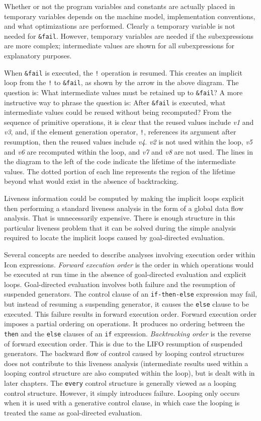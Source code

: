 Whether or not the program variables and constants are actually placed
in temporary variables depends on the machine model, implementation
conventions, and what optimizations are performed. Clearly a temporary
variable is not needed for \texttt{\&fail}. However, temporary variables are
needed if the subexpressions are more complex; intermediate values are
shown for all subexpressions for explanatory purposes.

When \texttt{\&fail} is executed, the \texttt{!} operation is
resumed. This creates an implicit loop from the \texttt{!} to
\texttt{\&fail}, as shown by the arrow in the above diagram. The
question is: What intermediate values must be retained up to
\texttt{\&fail}? A more instructive way to phrase the question is:
After \texttt{\&fail} is executed, what intermediate values could be
reused without being recomputed? From the sequence of primitive
operations, it is clear that the reused values include \textit{v1} and
\textit{v3}, and, if the element generation operator, \texttt{!},
references its argument after resumption, then the reused values
include \textit{v4}.\textit{ v2} is not used within the loop,
\textit{v5} and \textit{v6} are recomputed within the loop, and
\textit{v7} and \textit{v8} are not used. The lines in the diagram to
the left of the code indicate the lifetime of the intermediate
values. The dotted portion of each line represents the region of the
lifetime beyond what would exist in the absence of backtracking.

Liveness information could be computed by making the implicit loops
explicit then performing a standard liveness analysis in the form of a
global data flow analysis. That is unnecessarily expensive. There is
enough structure in this particular liveness problem that it can be
solved during the simple analysis required to locate the implicit
loops caused by goal-directed evaluation.

Several concepts are needed to describe analyses involving execution
order within Icon expressions. \textit{Forward execution order} is the
order in which operations would be executed at run time in the absence
of goal-directed evaluation and explicit loops. Goal-directed
evaluation involves both failure and the resumption of suspended
generators. The control clause of an \texttt{if-then-else} expression may fail,
but instead of resuming a suspending generator, it causes the \texttt{else}
clause to be executed. This failure results in forward execution
order. Forward execution order imposes a partial ordering on
operations. It produces no ordering between the \texttt{then} and the \texttt{else}
clauses of an \texttt{if} expression. \textit{Backtracking order} is the
reverse of forward execution order. This is due to the LIFO resumption
of suspended generators. The backward flow of control caused by
looping control structures does not contribute to this liveness
analysis (intermediate results used within a looping control structure
are also computed within the loop), but is dealt with in later
chapters. The \texttt{every} control structure is generally viewed as a looping
control structure.  However, it simply introduces failure. Looping
only occurs when it is used with a generative control clause, in which
case the looping is treated the same as goal-directed evaluation.

